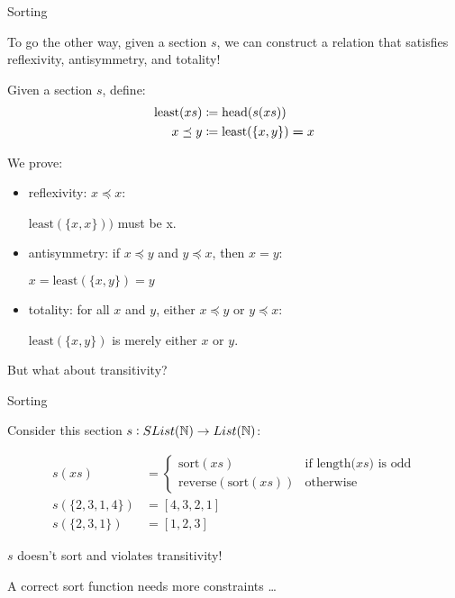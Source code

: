 \documentclass[9pt]{beamer}
\begin{document}
\begin{frame}{Sorting}

To go the other way, given a section $s$, 
we can construct a relation that satisfies \alert{reflexivity}, \alert{antisymmetry}, and \alert{totality}!

\begin{dblock}
    Given a section $s$, define:
    \begin{align*}
        \text{least}(xs) & \coloneqq \text{head}(s(xs)) \\
        x \preceq y      & \coloneqq \text{least}(\{x, y\}) \id x
    \end{align*}
\end{dblock}

We prove:
\begin{itemize}
    \item \alert{reflexivity}: $x \preceq x$:
    
    $\text{least}(\{x, x\}))$ must be x.
    
    \item \alert{antisymmetry}: if $x \preceq y$ and $y \preceq x$, then $x = y$:
    
    $x = \text{least}(\{x, y\}) = y$
    
    \item \alert{totality}: for all $x$ and $y$, either $x \preceq y$ or $y \preceq x$:
    
    $\text{least}(\{x, y\})$ is merely either $x$ or $y$.
    
\end{itemize}

But what about \alert{transitivity}?

\end{frame}

\begin{frame}{Sorting}


Consider this section $s : SList(\mathbb{N}) \to List(\mathbb{N})$:

\begin{align*}
    s(xs) & = \begin{cases}
        \text{sort}(xs)                  & \text{if length($xs$) is odd}   \\
        \text{reverse}(\text{sort}(xs))  & \text{otherwise}
    \end{cases} \\
    s(\{2,3,1,4\}) & = [4,3,2,1] \\
    s(\{2,3,1\}) & = [1, 2, 3]
\end{align*}

$s$ doesn't sort and violates \alert{transitivity}!

A correct sort function needs more constraints \ldots
    
\end{frame}
\end{document}
